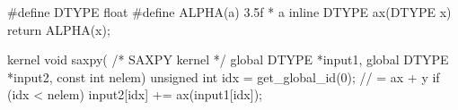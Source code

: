 #define DTYPE float
#define ALPHA(a) 3.5f * a
inline DTYPE ax(DTYPE x) { return ALPHA(x); }

kernel void saxpy( /* SAXPY kernel */
    global DTYPE *input1,
    global DTYPE *input2,
    const int nelem)
{
    unsigned int idx = get_global_id(0);
    // = ax + y
    if (idx < nelem) {
        input2[idx] += ax(input1[idx]); }}
